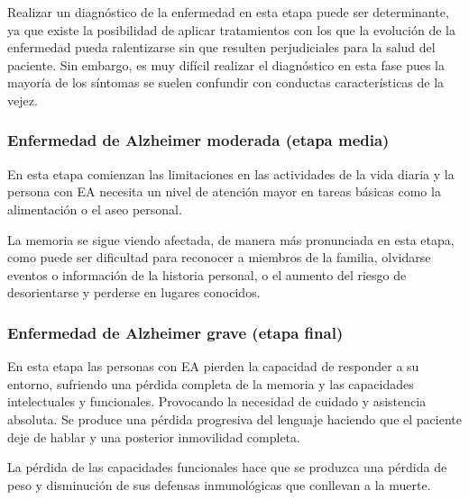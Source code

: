 Realizar un diagnóstico de la enfermedad en esta etapa puede ser determinante, ya que existe la posibilidad de aplicar
tratamientos con los que la evolución de la enfermedad pueda ralentizarse sin que resulten perjudiciales para la salud
del paciente.
Sin embargo, es muy difícil realizar el diagnóstico en esta fase pues la mayoría de los síntomas se suelen confundir con
conductas características de la vejez.

\subsubsection{Enfermedad de Alzheimer moderada (etapa media)}\label{subsubsec:etapa-media-EA}
En esta etapa comienzan las limitaciones en las actividades de la vida diaria y la persona con EA necesita un nivel de
atención mayor en tareas básicas como la alimentación o el aseo personal.

La memoria se sigue viendo afectada, de manera más pronunciada en esta etapa, como puede ser dificultad para reconocer a
miembros de la familia, olvidarse eventos o información de la historia personal, o el aumento del riesgo de
desorientarse y perderse en lugares conocidos.


\subsubsection{Enfermedad de Alzheimer grave (etapa final)}\label{subsubsec:etapa-final-EA}
En esta etapa las personas con EA pierden la capacidad de responder a su entorno, sufriendo una pérdida completa de la
memoria y las capacidades intelectuales y funcionales.
Provocando la necesidad de cuidado y asistencia absoluta.
Se produce una pérdida progresiva del lenguaje haciendo que el paciente deje de hablar y una posterior inmovilidad
completa.

La pérdida de las capacidades funcionales hace que se produzca una pérdida de peso y disminución de sus defensas
inmunológicas que conllevan a la muerte.

